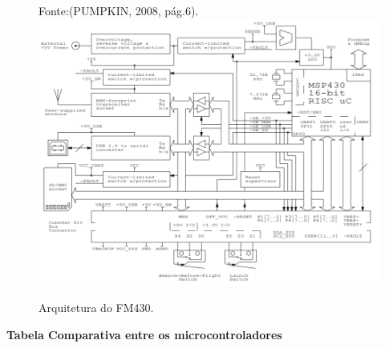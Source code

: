 \begin{itemize}
\begin{figure}[h]
	\centering
	Fonte:(PUMPKIN, 2008, pág.6).\linebreak
\includegraphics[keepaspectratio=true,scale=0.55]{figuras/fm430.PNG}
	\caption{Arquitetura do FM430.}
	\label{fig15}
\end{figure}

\end{itemize}

\newpage
\textbf{Tabela Comparativa entre os microcontroladores}


